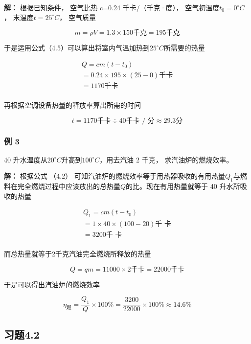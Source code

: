 \textbf{解：} 根据已知条件， 空气比热 c=0.24 千卡/（千克·度），
空气初温度\(t_{0}=0^{\circ}C\)， 末温度\(t=25^{\circ}C\)， 空气质量

\[
m = \rho V = 1.3 \times 150 \text{千克} = 195 \text{千克}
\]

于是运用公式（4.5）可以算出将室内气温加热到\(25^{\circ}C\)所需要的热量

\[
\begin{array}{l} Q = c m (t - t _ {0}) \\ = 0.24 \times 195 \times (25 - 0) \text{千卡} \\ = 1170 \text{千卡} \\ \end{array}
\]

再根据空调设备热量的释放率算出所需的时间

\[
t = 1170 \text{千卡} \div 40 \text{千卡 / 分} \approx 29.3 \text{分}
\]

\subsubsection{例 3}\label{ux4f8b-3-3}

40 升水温度从\(20^{\circ}C\)升高到\(100^{\circ}C\)，用去汽油 2 千克，
求汽油炉的燃烧效率。

\textbf{解：} 根据公式 （4.2）
可知汽油炉的燃烧效率等于用热器吸收的有用热量\(Q_{1}\)与燃料在完全燃烧过程中应该放出的总热量\(Q\)的比。现在有用热量就等于
40 升水所吸收的热量

\[
\begin{array}{l} Q _ {1} = c m (t - t _ {0}) \\ = 1 \times 40 \times (100 - 20) \text{千   卡} \\ = 3200 \text{千   卡} \\ \end{array}
\]

而总热量就等于2千克汽油完全燃烧所释放的热量

\[
Q = q m = 11000 \times 2 \text{千卡} = 22000 \text{千卡}
\]

于是可以得出汽油炉的燃烧效率

\[
\eta_ {\text{燃}} = \frac {Q _ {1}}{Q} \times 100 \% = \frac {3200}{22000} \times 100 \% \approx 14.6\%
\]

\subsection{习题4.2}\label{ux4e60ux98984.2}

